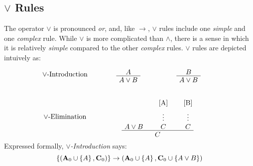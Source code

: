 \documentclass[11pt]{article}
\begin{document}
\subsection*{$\lor$ Rules}
The operator $\lor$ is pronounced {\em or}, and, like $\rightarrow$, $\lor$ rules include one {\em simple} and one {\em complex} rule.
While $\lor$ is more complicated than $\wedge$, there is a sense in which it is relatively {\em simple} compared to the other {\em complex} rules.
$\lor$ rules are depicted intuively as:
\begin{equation}
    \begin{tabular}{c c}
        $\lor$-Introduction &  
    \begin{minipage}{.5\textwidth}
        \begin{minipage}{.5\textwidth}
    \begin{prooftree}
        \AxiomC{$A$}
        \UnaryInfC{$A \lor B$}
    \end{prooftree}
        \end{minipage}%
        \begin{minipage}{.5\textwidth}
    \begin{prooftree}
        \AxiomC{$B$}
        \UnaryInfC{$A \lor B$}
    \end{prooftree}
        \end{minipage}
    \end{minipage}
        \\
        \vspace{10pt} %
        \\
        $\lor$-Elimination &
    \begin{minipage}{.5\textwidth}
    \begin{prooftree}
        \AxiomC{$A \lor B$}
        \AxiomC{[A]}
        \noLine
        \UnaryInfC{$\vdots$}
        \noLine
        \UnaryInfC{$C$}
        \AxiomC{[B]}
        \noLine
        \UnaryInfC{$\vdots$}
        \noLine
        \UnaryInfC{$C$}
        \TrinaryInfC{$C$}
    \end{prooftree}
    \end{minipage}
    \end{tabular}
\end{equation}
Expressed formally, {\em $\lor$-Introduction} says:
\begin{equation}
    \left\{\left({\bf A}_0 \cup \left\{A\right\}, {\bf C}_0\right)\right\} \rightarrow \left({\bf A}_0 \cup \left\{A\right\}, {\bf C}_0 \cup \left\{A \lor B\right\}\right)
\end{equation}
\end{document}
